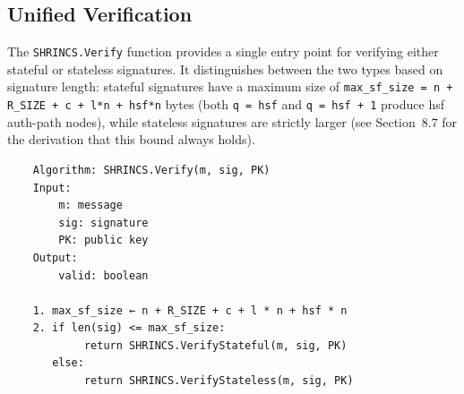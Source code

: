 \subsection{Unified Verification}
The \texttt{SHRINCS.Verify} function provides a single entry point for verifying either stateful or stateless signatures. It distinguishes between the two types based on signature length: stateful signatures have a maximum size of \texttt{max\_sf\_size = n + R\_SIZE + c + l*n + hsf*n} bytes (both \texttt{q = hsf} and \texttt{q = hsf + 1} produce hsf auth-path nodes), while stateless signatures are strictly larger (see Section~8.7 for the derivation that this bound always holds).
\begin{verbatim}
    Algorithm: SHRINCS.Verify(m, sig, PK)
    Input:
        m: message
        sig: signature
        PK: public key
    Output:
        valid: boolean

    1. max_sf_size ← n + R_SIZE + c + l * n + hsf * n
    2. if len(sig) <= max_sf_size:
            return SHRINCS.VerifyStateful(m, sig, PK)
       else:
            return SHRINCS.VerifyStateless(m, sig, PK)
\end{verbatim}